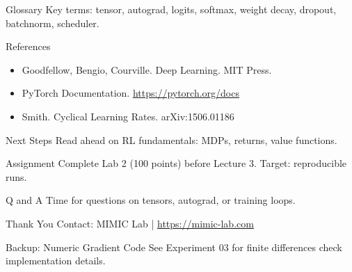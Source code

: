 \documentclass[aspectratio=169,10pt]{beamer}
\begin{document}
\begin{frame}{Glossary}
Key terms: tensor, autograd, logits, softmax, weight decay, dropout, batchnorm, scheduler.
\end{frame}

\begin{frame}{References}
\begin{itemize}
    \item Goodfellow, Bengio, Courville. Deep Learning. MIT Press.
    \item PyTorch Documentation. \url{https://pytorch.org/docs}
    \item Smith. Cyclical Learning Rates. arXiv:1506.01186
\end{itemize}
\end{frame}

\begin{frame}{Next Steps}
Read ahead on RL fundamentals: MDPs, returns, value functions.
\end{frame}

\begin{frame}{Assignment}
Complete Lab 2 (100 points) before Lecture 3. Target: reproducible runs.
\end{frame}

\begin{frame}{Q and A}
Time for questions on tensors, autograd, or training loops.
\end{frame}

\begin{frame}{Thank You}
Contact: MIMIC Lab | \url{https://mimic-lab.com}
\end{frame}

\begin{frame}{Backup: Numeric Gradient Code}
See Experiment 03 for finite differences check implementation details.
\end{frame}
\end{document}
